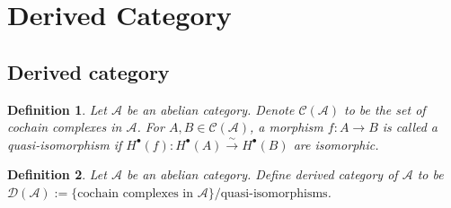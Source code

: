 \documentclass{ctexart}
\newtheorem{definition}{Definition}[section]
\begin{document}
\section{Derived Category}
\label{section:Derived_Category}

\subsection{Derived category}
\label{subsection:Derived_Category_Derived_category}

\begin{definition}
    Let $\mathscr{A}$ be an abelian category.
    Denote $\mathcal{C}(\mathscr{A})$ to be the set of cochain complexes in $\mathscr{A}$.
    For $A,B\in \mathcal{C}(\mathscr{A})$, a morphism $f: A \rightarrow B$ is called a quasi-isomorphism if $H^{\bullet}(f): H^{\bullet}(A) \overset{\sim}{\rightarrow} H^{\bullet}(B)$ are isomorphic.
\end{definition}
\begin{definition}
    Let $\mathscr{A}$ be an abelian category.
    Define derived category of $\mathscr{A}$ to be $\mathcal{D}(\mathscr{A}) := \{\text{cochain complexes in } \mathscr{A}\}/\text{quasi-isomorphisms}$.
\end{definition}
\end{document}
